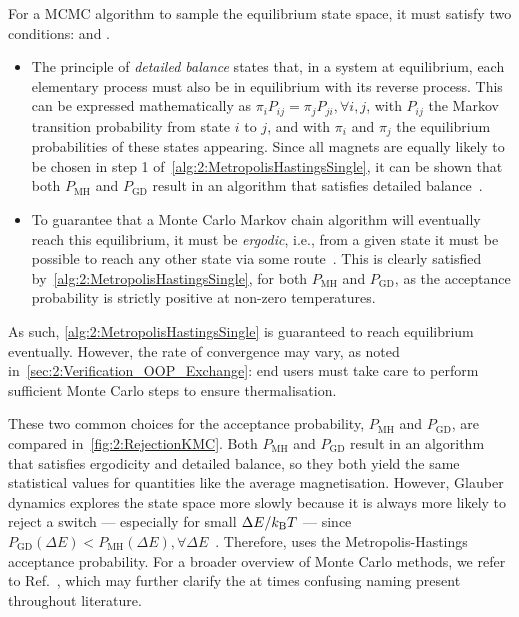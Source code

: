 For a MCMC algorithm to sample the equilibrium state space, it must satisfy two conditions:  and .
\begin{itemize}
	\item The principle of \textit{detailed balance} states that, in a system at equilibrium, each elementary process must also be in equilibrium with its reverse process.
	This can be expressed mathematically as $\pi_i P_{ij} = \pi_j P_{ji}, \forall i,j$, with $P_{ij}$ the Markov transition probability from state $i$ to $j$, and with $\pi_i$ and $\pi_j$ the equilibrium probabilities of these states appearing.
	Since all magnets are equally likely to be chosen in step 1 of~\cref{alg:2:MetropolisHastingsSingle}, it can be shown that both $P_\mathrm{MH}$ and $P_\mathrm{GD}$ result in an algorithm that satisfies detailed balance~\cite{kyimba2006comparisonIsingAlgorithms}.
	\item To guarantee that a Monte Carlo Markov chain algorithm will eventually reach this equilibrium, it must be \textit{ergodic}, i.e., from a given state it must be possible to reach any other state via some route~\cite{kyimba2006comparisonIsingAlgorithms}.
	This is clearly satisfied by~\cref{alg:2:MetropolisHastingsSingle}, for both $P_\mathrm{MH}$ and $P_\mathrm{GD}$, as the acceptance probability is strictly positive at non-zero temperatures.
\end{itemize}
As such, \cref{alg:2:MetropolisHastingsSingle} is guaranteed to reach equilibrium eventually.
However, the rate of convergence may vary, as noted in~\cref{sec:2:Verification_OOP_Exchange}: end users must take care to perform sufficient Monte Carlo steps to ensure thermalisation. %

\vspace{-1em}
\vspace{-1em}

These two common choices for the acceptance probability, $P_\mathrm{MH}$ and $P_\mathrm{GD}$, are compared in~\cref{fig:2:RejectionKMC}.
Both $P_\mathrm{MH}$ and $P_\mathrm{GD}$ result in an algorithm that satisfies ergodicity and detailed balance, so they both yield the same statistical values for quantities like the average magnetisation.
However, Glauber dynamics explores the state space more slowly because it is always more likely to reject a switch --- especially for small $\Delta E / \kBT$ --- since $P_\mathrm{GD}(\Delta E) < P_\mathrm{MH}(\Delta E), \forall \Delta E$~\cite{jang2004stochastic}.
Therefore, \hotspice uses the Metropolis-Hastings acceptance probability.
For a broader overview of Monte Carlo methods, we refer to Ref.~\cite{IntroductionMC}, which may further clarify the at times confusing naming present throughout literature.

